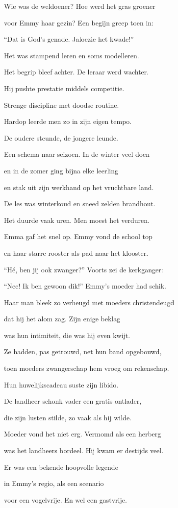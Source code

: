 Wie was de weldoener?
Hoe werd het gras groener

voor Emmy haar gezin?
Een begijn greep toen in:

“Dat is God’s genade.
Jaloezie het kwade!”

Het was stampend leren
en soms modelleren.

Het begrip bleef achter.
De leraar werd wachter.

Hij pushte prestatie
middels competitie.

Strenge discipline
met doodse routine.

Hardop leerde men zo
in zijn eigen tempo.

De oudere steunde,
de jongere leunde.

Een schema naar seizoen.
In de winter veel doen

en in de zomer ging
bijna elke leerling

en stak uit zijn werkhand
op het vruchtbare land.

De les was winterkoud
en sneed zelden brandhout.

Het duurde vaak uren.
Men moest het verduren.

Emma gaf het snel op.
Emmy vond de school top

en haar starre rooster
als pad naar het klooster.

“Hé, ben jij ook zwanger?”
Voorts zei de kerkganger:

“Nee! Ik ben gewoon dik!”
Emmy’s moeder had schik.

Haar man bleek zo verheugd
met moeders christendeugd

dat hij het alom zag.
Zijn enige beklag

was hun intimiteit,
die was hij even kwijt.

Ze hadden, pas getrouwd,
net hun band opgebouwd,

toen moeders zwangerschap
hem vroeg om rekenschap.

Hun huwelijkscadeau
suste zijn libido.

De landheer schonk vader
een gratis ontlader,

die zijn lusten stilde,
zo vaak als hij wilde.

Moeder vond het niet erg.
Vermomd als een herberg

was het landheers bordeel.
Hij kwam er destijds veel.

Er was een bekende
hoopvolle legende

in Emmy’s regio,
als een scenario

voor een vogelvrije.
En wel een gastvrije.

